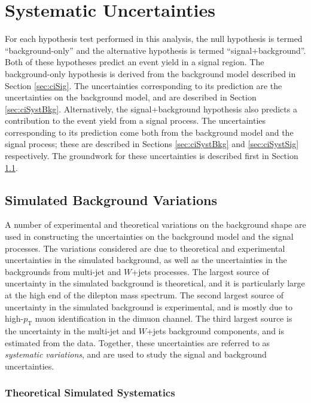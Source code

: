 \section{Systematic Uncertainties}\label{sec:ciSyst}

For each hypothesis test performed in this analysis, the null hypothesis is termed ``background-only'' and the alternative hypothesis is termed ``signal+background''.
Both of these hypotheses predict an event yield in a signal region.
The background-only hypothesis is derived from the background model described in Section \ref{sec:ciSig}.
The uncertainties corresponding to its prediction are the uncertainties on the background model, and are described in Section \ref{sec:ciSystBkg}.
Alternatively, the signal+background hypothesis also predicts a contribution to the event yield from a signal process.
The uncertainties corresponding to its prediction come both from the background model and the signal process; these are described in Sections \ref{sec:ciSystBkg} and \ref{sec:ciSystSig} respectively.
The groundwork for these uncertainties is described first in Section \ref{sec:ciSystVars}.

\subsection{Simulated Background Variations}\label{sec:ciSystVars}

A number of experimental and theoretical variations on the background shape are used in constructing the uncertainties on the background model and the signal processes.
The variations considered are due to theoretical and experimental uncertainties in the simulated background, as well as the uncertainties in the backgrounds from multi-jet and $W$+jets processes.
The largest source of uncertainty in the simulated background is theoretical, and it is particularly large at the high end of the dilepton mass spectrum.
The second largest source of uncertainty in the simulated background is experimental, and is mostly due to high-$p_\text{T}$ muon identification in the dimuon channel.
The third largest source is the uncertainty in the multi-jet and $W$+jets background components, and is estimated from the data.
Together, these uncertainties are referred to as \emph{systematic variations}, and are used to study the signal and background uncertainties.

\subsubsection{Theoretical Simulated Systematics}\label{sec:ciThySyst}

